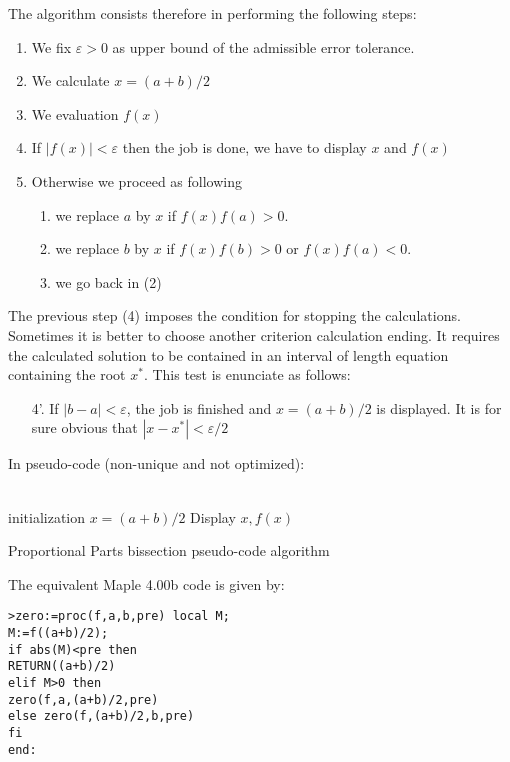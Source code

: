 	The algorithm consists therefore in performing the following steps:
	\begin{enumerate}
		\item We fix $\varepsilon>0$ as upper bound of the admissible error tolerance.
		
		\item We calculate $x=(a+b)/2$

		\item We evaluation $f(x)$
		
		\item If $|f(x)|<\varepsilon$ then the job is done, we have to display $x$ and $f(x)$
	
		\item Otherwise we proceed as following
			\begin{enumerate}
				\item we replace $a$ by $x$ if $f(x)f(a)>0$.
	
				\item we replace $b$ by $x$ if $f(x)f(b)>0$ or $f(x)f(a)<0$.
				
				\item we go back in (2)
			\end{enumerate}
	\end{enumerate}
	The previous step (4) imposes the condition for stopping the calculations. Sometimes it is better to choose another criterion calculation ending. It requires the calculated solution to be contained in an interval of length equation containing the root $x^{*}$. This test is enunciate as follows:
	\begin{enumerate}
		\item[4'.] If $|b-a|<\varepsilon$, the job is finished and $x=(a+b)/2$ is displayed. It is for sure obvious that $|x-x^{*}|<\varepsilon/2$
	\end{enumerate}
	In pseudo-code (non-unique and not optimized):\\\\
	\begin{algorithm}[H]
	 initialization\;
	$x=(a+b)/2$\;
	 Display $x,f(x)$\;
	 \caption{Proportional Parts bissection pseudo-code algorithm}
	\end{algorithm}
	The equivalent Maple 4.00b code is given by:
	
	\texttt{>zero:=proc(f,a,b,pre)
	local M;\\
	M:=f((a+b)/2);\\
	if abs(M)<pre then \\
	     RETURN((a+b)/2)\\
	elif M>0 then\\
	     zero(f,a,(a+b)/2,pre)\\
	else zero(f,(a+b)/2,b,pre)\\
	     fi\\
	end:}
	
